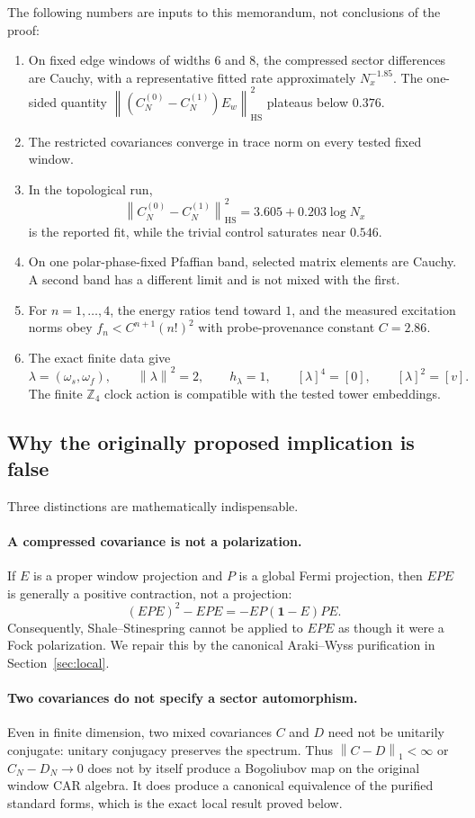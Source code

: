\documentclass[11pt]{article}
\theoremstyle{remark}
\newcommand{\HS}{\mathrm{HS}}
\newcommand{\id}{\mathbf 1}
\newcommand{\norm}[1]{\left\lVert #1\right\rVert}
\begin{document}
The following numbers are inputs to this memorandum, not conclusions of
the proof:
\begin{enumerate}[label=(D\arabic*)]
\item On fixed edge windows of widths $6$ and $8$, the compressed
  sector differences are Cauchy, with a representative fitted rate
  approximately $N_x^{-1.85}$.  The one-sided quantity
  $\norm{(C_N^{(0)}-C_N^{(1)})E_w}_{\HS}^2$ plateaus below $0.376$.
\item The restricted covariances converge in trace norm on every tested
  fixed window.
\item In the topological run,
  \[
  \norm{C_N^{(0)}-C_N^{(1)}}_{\HS}^2
  =3.605+0.203\log N_x
  \]
  is the reported fit, while the trivial control saturates near $0.546$.
\item On one polar-phase-fixed Pfaffian band, selected matrix elements
  are Cauchy.  A second band has a different limit and is not mixed with
  the first.
\item For $n=1,\ldots,4$, the energy ratios tend toward $1$, and the
  measured excitation norms obey
  $f_n<C^{n+1}(n!)^2$ with probe-provenance constant $C=2.86$.
\item The exact finite data give
  \[
  \lambda=(\omega_s,\omega_f),\qquad
  \norm{\lambda}^2=2,\qquad h_\lambda=1,\qquad
  [\lambda]^4=[0],\qquad [\lambda]^2=[v].
  \]
  The finite $\mathbb Z_4$ clock action is compatible with the tested
  tower embeddings.
\end{enumerate}

\subsection{Why the originally proposed implication is false}

Three distinctions are mathematically indispensable.

\paragraph{A compressed covariance is not a polarization.}
If $E$ is a proper window projection and $P$ is a global Fermi projection,
then $EPE$ is generally a positive contraction, not a projection:
\[
 (EPE)^2-EPE=-EP(\id-E)PE.
\]
Consequently, Shale--Stinespring cannot be applied to $EPE$ as though it
were a Fock polarization.  We repair this by the canonical
Araki--Wyss purification in Section~\ref{sec:local}.

\paragraph{Two covariances do not specify a sector automorphism.}
Even in finite dimension, two mixed covariances $C$ and $D$ need not be
unitarily conjugate: unitary conjugacy preserves the spectrum.  Thus
$\norm{C-D}_{1}<\infty$ or $C_N-D_N\to0$ does not by itself produce a
Bogoliubov map on the original window CAR algebra.  It does produce a
canonical equivalence of the purified standard forms, which is the exact
local result proved below.
\end{document}
